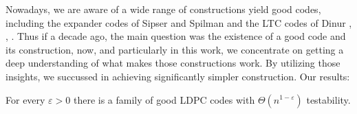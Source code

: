 
  Nowadays, we are aware of a wide range of constructions yield good codes, including the expander codes of Sipser and Spilman \cite{ExpanderCodes} and the LTC codes of Dinur \cite{Dinur}, \cite{Pavel}, \cite{leverrier2022quantum}. Thus if a decade ago, the main question was the existence of a good code and its construction, now, and particularly in this work, we concentrate on getting a deep understanding of what makes those constructions work. By utilizing those insights, we succussed in achieving significantly simpler construction. Our results: 

  \begin{theorem} \label{thm} For every $\varepsilon > 0 $ there is a family of good LDPC codes with $\Theta\left( n^{1-\varepsilon} \right)$ testability. 
  \end{theorem}



